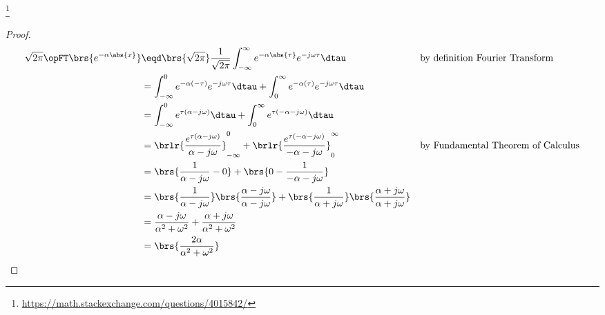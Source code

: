 \begin{example}
\label{ex:eatau}
\footnote{
  \url{https://math.stackexchange.com/questions/4015842/}
  }
\end{example}
\begin{proof}
\begin{align*}
  \sqrt{2\pi}\opFT\brs{e^{-\alpha\abs{x}}}
    &\eqd \brs{\sqrt{2\pi}}\frac{1}{\sqrt{2\pi}}\int_{-\infty}^{\infty} e^{-\alpha\abs{\tau}} e^{-j\omega\tau}\dtau
    && \text{by definition Fourier Transform}
  \\&= \int_{-\infty}^{0} e^{-\alpha(-\tau)} e^{-j\omega\tau}\dtau
     + \int_{0}^{\infty} e^{-\alpha(\tau)} e^{-j\omega\tau}\dtau
  \\&= \int_{-\infty}^{0} e^{\tau(\alpha-j\omega)}\dtau
     + \int_{0}^{\infty} e^{\tau(-\alpha-j\omega)}\dtau
  \\&= \brlr{\frac{e^{\tau(\alpha-j\omega)}}{\alpha-j\omega}}_{-\infty}^{0}
     + \brlr{\frac{e^{\tau(-\alpha-j\omega)}}{-\alpha-j\omega}}_{0}^{\infty}
    && \text{by Fundamental Theorem of Calculus}
  \\&= \brs{\frac{1}{\alpha-j\omega} - 0}
     + \brs{0- \frac{1}{-\alpha-j\omega}}
  \\&= \brs{\frac{1}{\alpha-j\omega}}\brs{\frac{\alpha-j\omega}{\alpha-j\omega}}
     + \brs{\frac{1}{\alpha+j\omega}}\brs{\frac{\alpha+j\omega}{\alpha+j\omega}}
  \\&= \frac{\alpha-j\omega}{\alpha^2+\omega^2}
     + \frac{\alpha+j\omega}{\alpha^2+\omega^2}
  \\&= \brs{\frac{2\alpha}{\alpha^2+\omega^2}}
\end{align*}
\end{proof}

